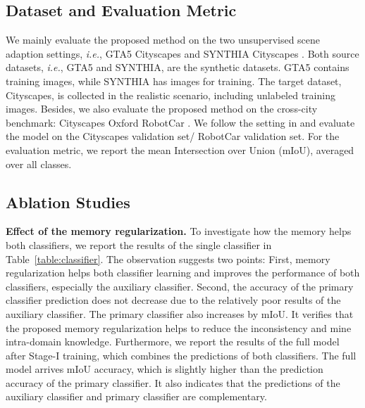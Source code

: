 \documentclass{article}
\def\ie{\emph{i.e.}}
\begin{document}
\subsection{Dataset and Evaluation Metric}
We mainly evaluate the proposed method on the two unsupervised scene adaption settings, \ie, GTA5 \cite{richter2016playing}  Cityscapes \cite{cordts2016cityscapes} and SYNTHIA \cite{ros2016synthia}  Cityscapes \cite{cordts2016cityscapes}. Both source datasets, \ie, GTA5 and SYNTHIA, are the synthetic datasets. GTA5 contains  training images, while SYNTHIA has  images for training. The target dataset, Cityscapes, is collected in the realistic scenario, including  unlabeled training images. Besides, we also evaluate the proposed method on the cross-city benchmark: Cityscapes \cite{cordts2016cityscapes}  Oxford RobotCar \cite{RobotCarDatasetIJRR}. We follow the setting in \cite{tsai2019domain} and evaluate the model on the Cityscapes validation set/ RobotCar validation set. For the evaluation metric, we report the mean Intersection over Union (mIoU), averaged over all classes.

\subsection{Ablation Studies} \label{sec:ablation}
\noindent\textbf{Effect of the memory regularization.} 
To investigate how the memory helps both classifiers, we report the results of the single classifier in Table~\ref{table:classifier}. The observation suggests two points: First, memory regularization helps both classifier learning and improves the performance of both classifiers, especially the auxiliary classifier. Second, the accuracy of the primary classifier prediction does not decrease due to the relatively poor results of the auxiliary classifier. The primary classifier also increases by  mIoU. It verifies that the proposed memory regularization helps to reduce the inconsistency and mine intra-domain knowledge.
Furthermore, we report the results of the full model after Stage-I training, which combines the predictions of both classifiers. The full model arrives  mIoU accuracy, which is slightly higher than the prediction accuracy of the primary classifier. It also indicates that the predictions of the auxiliary classifier and primary classifier are complementary.
\end{document}
